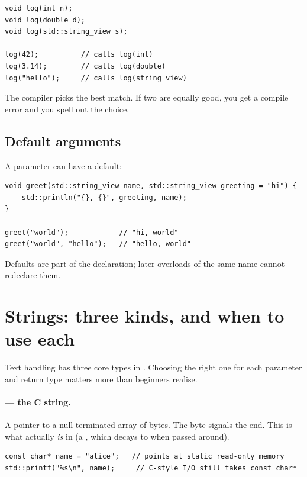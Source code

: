 \begin{lstlisting}
void log(int n);
void log(double d);
void log(std::string_view s);

log(42);          // calls log(int)
log(3.14);        // calls log(double)
log("hello");     // calls log(string_view)
\end{lstlisting}

The compiler picks the best match. If two are equally good, you get
a compile error and you spell out the choice.

\subsection{Default arguments}

A parameter can have a default:

\begin{lstlisting}
void greet(std::string_view name, std::string_view greeting = "hi") {
    std::println("{}, {}", greeting, name);
}

greet("world");            // "hi, world"
greet("world", "hello");   // "hello, world"
\end{lstlisting}

Defaults are part of the declaration; later overloads of the same
name cannot redeclare them.

\section{Strings: three kinds, and when to use each}
\label{sec:cpp:strings}

Text handling has three core types in \cpp{}. Choosing the right one
for each parameter and return type matters more than beginners
realise.

\paragraph{ --- the C string.}
A pointer to a null-terminated array of bytes. The 
byte signals the end. This is what  actually \emph{is}
in \cpp{} (a , which decays to  when passed around).

\begin{lstlisting}
const char* name = "alice";   // points at static read-only memory
std::printf("%s\n", name);     // C-style I/O still takes const char*
\end{lstlisting}

